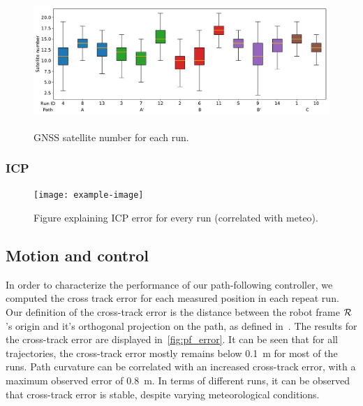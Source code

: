 \begin{figure} [htpb]
	\centering
	\includegraphics[height=2.0in]{./figs/GPS/Satellite_number.pdf}
	\caption{GNSS satellite number for each run.}
	\label{fig:gnss_satellite_number}
\end{figure}

\subsubsection{ICP}
\label{sec:ICP}

\lightlipsum[1]

\begin{figure} [htpb]
	\centering
	\texttt{[image: example-image]}
	\caption{Figure explaining ICP error for every run (correlated with meteo).}
	\label{fig:icp_error}
\end{figure}



\subsection{Motion and control}
\label{sec:res_motion}

In order to characterize the performance of our path-following controller, we computed the cross track error for each measured position in each repeat run.
Our definition of the cross-track error is the distance between the robot frame $\mathcal{R}$'s origin and it's orthogonal projection on the path, as defined in~\citep{Mondoloni2005}.
The results for the cross-track error are displayed in~\autoref{fig:pf_error}.
It can be seen that for all trajectories, the cross-track error mostly remains below \SI{0.1}{m} for most of the runs.
Path curvature can be correlated with an increased cross-track error, with a maximum observed error of \SI{0.8}{m}.
In terms of different runs, it can be observed that cross-track error is stable, despite varying meteorological conditions. 

